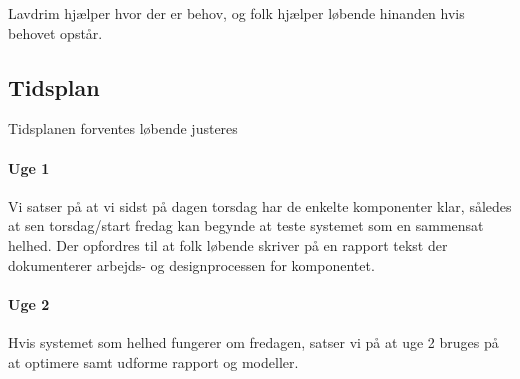 \documentclass[a4paper]{article}
\begin{document}
Lavdrim hjælper hvor der er behov, og folk hjælper løbende hinanden hvis behovet opstår.


\subsection{Tidsplan} %
\label{sub:Tidsplan}

Tidsplanen forventes løbende justeres

\paragraph{Uge 1} %
\label{par:Uge 1}

Vi satser på at vi sidst på dagen torsdag har de enkelte komponenter klar, således at sen torsdag/start fredag kan begynde at teste systemet som en sammensat helhed. Der opfordres til at folk løbende skriver på en rapport tekst der dokumenterer arbejds- og designprocessen for komponentet.


\paragraph{Uge 2} %
\label{par:Uge 2}

Hvis systemet som helhed fungerer om fredagen, satser vi på at uge 2 bruges på at optimere samt udforme rapport og modeller. 



\end{document}
